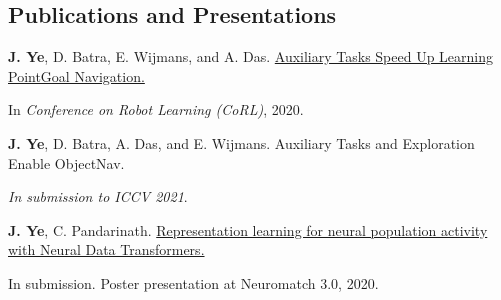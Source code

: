 \subsection*{Publications and Presentations}
    \textbf{J. Ye}, D. Batra, E. Wijmans, and A. Das.
    \href{https://arxiv.org/abs/2007.04561}
    {Auxiliary Tasks Speed Up Learning PointGoal Navigation.}

    In \emph{Conference on Robot Learning (CoRL)}, 2020.

    \textbf{J. Ye}, D. Batra, A. Das, and E. Wijmans. Auxiliary Tasks and Exploration Enable ObjectNav.

    \emph{In submission to ICCV 2021}.


    \textbf{J. Ye}, C. Pandarinath. \href{https://www.youtube.com/watch?v=lEXSdoIGNWY}
    {Representation learning for neural population activity with Neural Data Transformers.}

    In submission. Poster presentation at Neuromatch 3.0, 2020.
